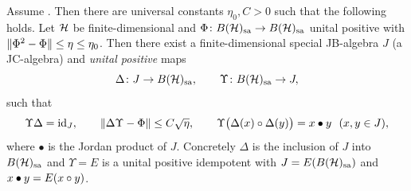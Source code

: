 \begin{theorem}\label{thm:factorization}
Assume . Then there are universal constants $\eta_0,C>0$ such that
the following holds. Let $\mathcal{H}$ be finite-dimensional and
$\Phi\colon B(\mathcal{H})_{\mathrm{sa}}\to B(\mathcal{H})_{\mathrm{sa}}$ unital positive with
$\lVert \Phi^2-\Phi \rVert\le\eta\le\eta_0$. Then there exist a finite-dimensional
special JB-algebra $J$ (a JC-algebra) and \emph{unital positive} maps
\[
  \Delta\colon J\to B(\mathcal{H})_{\mathrm{sa}},\qquad \Upsilon\colon B(\mathcal{H})_{\mathrm{sa}}\to J,
\]
such that
\[
  \Upsilon\Delta=\mathrm{id}_J,\qquad
  \lVert \Delta\Upsilon-\Phi \rVert\le C\sqrt{\eta},\qquad
  \Upsilon\bigl(\Delta(x)\circ\Delta(y)\bigr)=x\bullet y\ \ (x,y\in J),
\]
where $\bullet$ is the Jordan product of $J$. Concretely $\Delta$ is the
inclusion of $J$ into $B(\mathcal{H})_{\mathrm{sa}}$ and $\Upsilon=E$ is a unital positive idempotent
with $J=E(B(\mathcal{H})_{\mathrm{sa}})$ and $x\bullet y=E(x\circ y)$.
\end{theorem}

